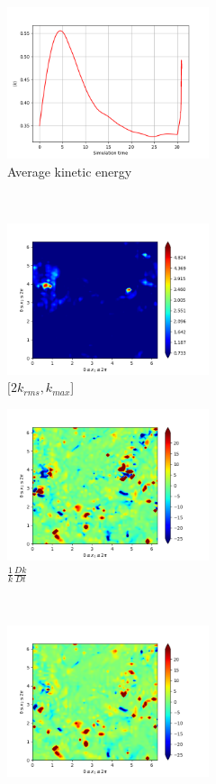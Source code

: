 \begin{figure}[H]
    \begin{subfigure}[H]{0.45\textwidth}
        \includegraphics[height=1.75in]{media/run-cds-65/ke-average1440.png}
        \caption{Average kinetic energy}
    \end{subfigure}
    ~
    \begin{subfigure}[H]{0.45\textwidth}
        \includegraphics[height=1.75in]{media/run-cds-65/ke-2-1440.png}
        \caption{$[2k_{rms}, k_{max} $] }
    \end{subfigure}
    \newline
    \begin{subfigure}[H]{0.45\textwidth}
        \includegraphics[height=1.75in]{media/run-cds-65/ke-1440.png}
        \caption{$\frac{1}{k} \frac{D k}{Dt}$}
    \end{subfigure}
    ~
    \begin{subfigure}{0.45\textwidth}
        \includegraphics[height=1.75in]{media/run-cds-65/A-ke-1440.png}

\end{subfigure}
\end{figure}
